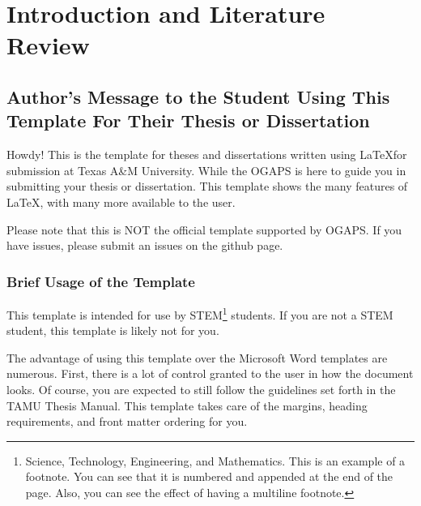 

\chapter{Introduction and Literature Review}

\section{Author's Message to the Student Using This Template For Their Thesis or Dissertation}

Howdy! This is the template for theses and dissertations written using \LaTeX for submission at Texas A\&M University. While the \ac{OGAPS} is here to guide you in submitting your thesis or dissertation. This template shows the many features of \LaTeX, with many more available to the user.

Please note that this is NOT the official template supported by \ac{OGAPS}. If you have issues, please submit an issues on the github page.


\subsection{Brief Usage of the Template}

This template is intended for use by STEM\footnote{Science, Technology, Engineering, and Mathematics. This is an example of a footnote. You can see that it is numbered and appended at the end of the page. Also, you can see the effect of having a multiline footnote.} students. If you are not a STEM student, this template is likely not for you.

The advantage of using this template over the Microsoft Word templates are numerous. First, there is a lot of control granted to the user in how the document looks. Of course, you are expected to still follow the guidelines set forth in the TAMU Thesis Manual. This template takes care of the margins, heading requirements, and front matter ordering for you.


